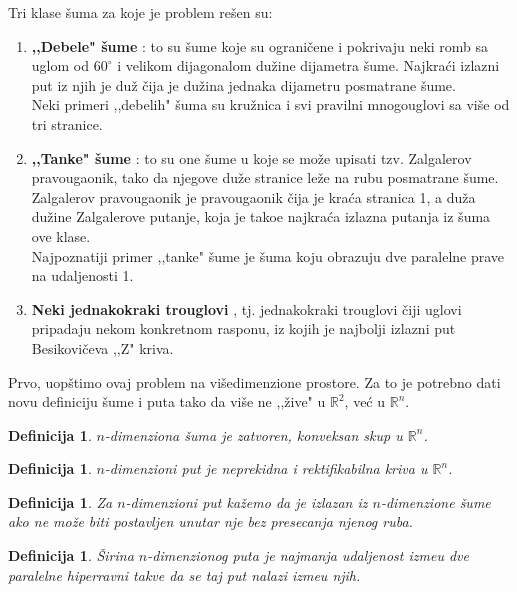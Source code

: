 \documentclass[11pt,letter]{article}
\newtheorem{df}[teo]{\bf Definicija}
\begin{document}
Tri klase \v suma za koje je problem re\v sen su:
\begin{enumerate}
\item \textbf{,,Debele" \v sume} \cite{Finch}: to su \v sume koje su ograni\v cene i pokrivaju neki romb sa uglom od $60^\circ$ i velikom dijagonalom du\v zine dijametra \v sume. Najkra\' ci izlazni put iz njih je du\v z \v cija je du\v zina jednaka dijametru posmatrane \v sume. 
\\
Neki primeri  ,,debelih" \v suma su kru\v znica i svi pravilni mnogouglovi sa vi\v se od tri stranice.
\item \textbf{,,Tanke" \v sume} \cite{Zalgaller}: to su one \v sume u koje se mo\v ze upisati tzv. Zalgalerov pravougaonik, tako da njegove du\v ze stranice le\v ze na rubu posmatrane \v sume. Zalgalerov pravougaonik je pravougaonik \v cija je kra\' ca stranica 1, a du\v za du\v zine Zalgalerove putanje, koja je tako\dj e najkra\' ca izlazna putanja iz \v suma ove klase.
\\
Najpoznatiji primer ,,tanke" \v sume je \v suma koju obrazuju dve paralelne prave na udaljenosti 1.
\item \textbf{Neki jednakokraki trouglovi} \cite{Besikovic}, tj. jednakokraki trouglovi \v ciji uglovi pripadaju nekom konkretnom rasponu, iz kojih je najbolji izlazni put Besikovi\v ceva ,,Z" kriva.
\end{enumerate}
\smallskip
\bigskip
Prvo, uop\v stimo ovaj problem na vi\v sedimenzione prostore. Za to je potrebno dati novu definiciju \v sume i puta tako da vi\v se ne ,,\v zive" u $\mathbb{R}^2$, ve\' c u $\mathbb{R}^n$.
\smallskip
\begin{df} $n$-dimenziona \v suma je zatvoren, konveksan skup u $\mathbb{R}^n$.\end{df}
\begin{df} $n$-dimenzioni put je neprekidna i rektifikabilna kriva u $\mathbb{R}^n$.\end{df}
\begin{df} Za $n$-dimenzioni put ka\v zemo da je izlazan iz $n$-dimenzione \v sume ako ne mo\v ze biti postavljen unutar nje bez presecanja njenog ruba.\end{df}
\begin{df} \v Sirina $n$-dimenzionog puta je najmanja udaljenost izme\dj u dve paralelne hiperravni takve da se taj put nalazi izme\dj u njih. \end{df}
\smallskip
\end{document}
